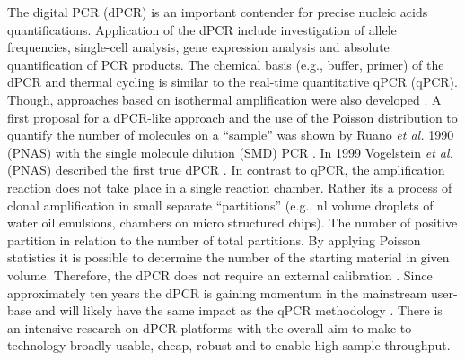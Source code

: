 \documentclass[a4,center,fleqn]{NAR}
\begin{document}
The digital PCR (dPCR) is an important contender for precise nucleic acids 
quantifications. Application of the dPCR include investigation of allele 
frequencies, single-cell analysis, gene expression analysis and absolute quantification of PCR 
products. The chemical basis (e.g., buffer, primer) of the dPCR and thermal 
cycling is similar to the real-time quantitative qPCR (qPCR). Though, approaches 
based on isothermal amplification were also developed 
\cite{pabinger_survey_2014, ludlow_2014, rodiger_r_2015}. A first proposal for a dPCR-like 
approach and the use of the Poisson distribution to quantify the number of 
molecules on a ``sample'' was shown by Ruano \textit{et al.} 1990 (PNAS) with 
the single molecule dilution (SMD) PCR \cite{ruano_haplotype_1990}. In 1999 
Vogelstein \textit{et al.} (PNAS) described the first true dPCR 
\cite{vogelstein_digital_1999}. In contrast to qPCR, the amplification reaction 
does not take place in a single reaction chamber. Rather its a process of clonal 
amplification in small separate ``partitions'' (e.g., nl volume droplets of 
water oil emulsions, chambers on micro structured chips). The number of positive 
partition in relation to the number of total partitions. By applying Poisson 
statistics it is possible to determine the number of the starting material in 
given volume. Therefore, the dPCR does not require an external calibration 
\cite{selck_increased_2013, rodiger_r_2015}. Since approximately ten years the 
dPCR is gaining momentum in the mainstream user-base and will 
likely have the same impact as the qPCR methodology \cite{huggett_qpcr_2015, 
morley_digital_2014, rodiger_r_2015}. There is an intensive research on dPCR 
platforms with the overall aim to make to technology broadly usable, cheap, 
robust and to enable high sample throughput.

\enlargethispage{-65.1pt}
  
\end{document}
